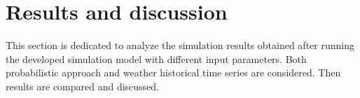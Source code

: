 \section{Results and discussion}
This section is dedicated to analyze the simulation results obtained after running the developed simulation model with different input parameters. Both probabilistic approach and weather historical time series are considered. Then results are compared and discussed.
